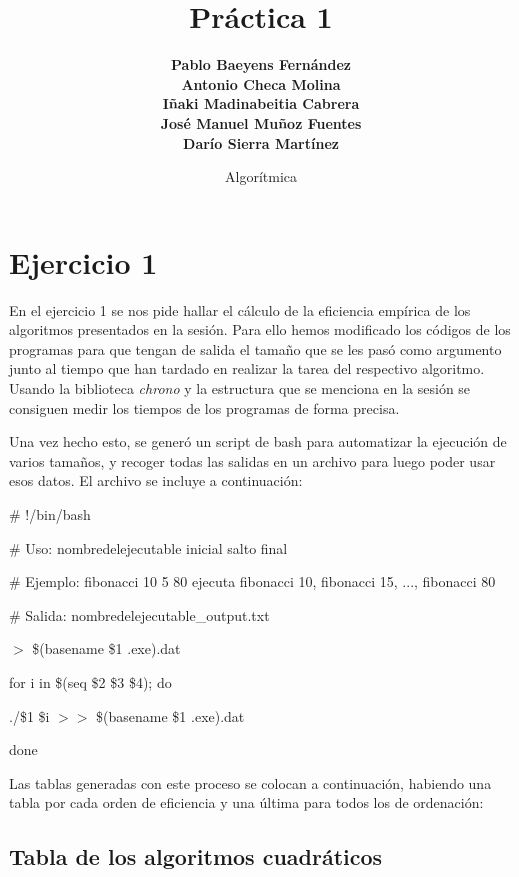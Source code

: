 \documentclass[a4paper, 11pt]{article}
\title{\Huge \textbf{Práctica 1}}
\author{\textbf{Pablo Baeyens Fernández} \\ \textbf{Antonio Checa Molina} \\ \textbf{Iñaki Madinabeitia Cabrera} \\  \textbf{José Manuel Muñoz Fuentes} \\ \textbf{Darío Sierra Martínez} \\ }
\date{Algorítmica}
\begin{document}
\maketitle
\tableofcontents

\newpage
\section{Ejercicio 1}
En el ejercicio 1 se nos pide hallar el cálculo de la eficiencia empírica de los algoritmos presentados en la sesión. Para ello hemos modificado los códigos de los programas para que tengan de salida el tamaño que se les pasó como argumento junto al tiempo que han tardado en realizar la tarea del respectivo algoritmo. Usando la biblioteca \textit{chrono} y la estructura que se menciona en la sesión se consiguen medir los tiempos de los programas de forma precisa.

Una vez hecho esto, se generó un script de bash para automatizar la ejecución de varios tamaños, y recoger todas las salidas en un archivo para luego poder usar esos datos. El archivo se incluye a continuación:


\begin{framed}
	
	\# !/bin/bash
	
	\# Uso: nombredelejecutable inicial salto final

	\# Ejemplo: fibonacci 10 5 80 ejecuta fibonacci 10, fibonacci 15, ..., fibonacci 80
	
	\# Salida: nombredelejecutable\_output.txt
	\vspace{0.3cm}
	
	$>$ \$(basename \$1 .exe).dat
	
	for i in \$(seq \$2 \$3 \$4); do
	
	\hspace{0.4cm}./\$1 \$i $>>$ \$(basename \$1 .exe).dat
	
	done
	
\end{framed}

Las tablas generadas con este proceso se colocan a continuación, habiendo una tabla por cada orden de eficiencia y una última para todos los de ordenación:

\subsection{Tabla de los algoritmos cuadráticos}

\end{document}
